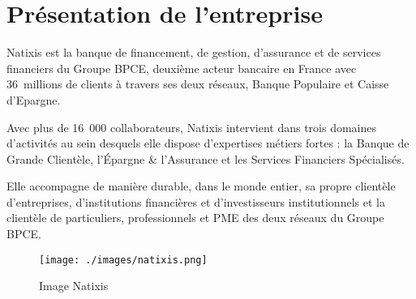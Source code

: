 \section *{Présentation de l'entreprise}
Natixis est la banque de financement, de gestion, d’assurance et de services financiers du Groupe BPCE, deuxième acteur bancaire en France avec 36 millions de clients à travers ses deux réseaux, Banque Populaire et Caisse d’Epargne.

Avec plus de 16 000 collaborateurs, Natixis intervient dans trois domaines d’activités au sein desquels elle dispose d’expertises métiers fortes : la Banque de Grande Clientèle, l’Épargne & l’Assurance et les Services Financiers Spécialisés.

Elle accompagne de manière durable, dans le monde entier, sa propre clientèle d’entreprises, d'institutions financières et d'investisseurs institutionnels et la clientèle de particuliers, professionnels et PME des deux réseaux du Groupe BPCE. 
\begin{figure}[!ht]
    \center
    \texttt{[image: ./images/natixis.png]}
    \caption{Image Natixis}
    
\end{figure}

